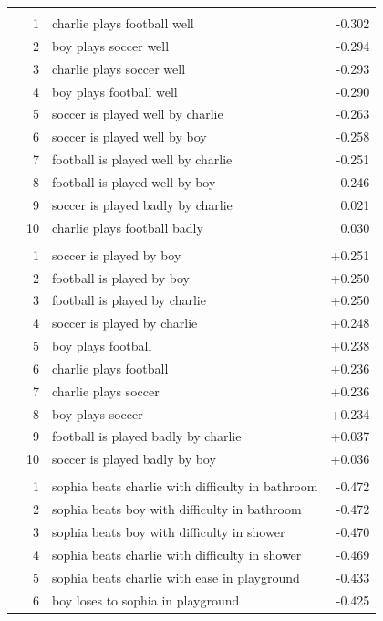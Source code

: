 \begin{longtable}{@{}lrlr@{}}
\bottomrule
\endlastfoot
\multicolumn{4}{l}{\textit{Word -- Hardest}} \\
 & 1 & charlie plays football well & -0.302 \\
 & 2 & boy plays soccer well & -0.294 \\
 & 3 & charlie plays soccer well & -0.293 \\
 & 4 & boy plays football well & -0.290 \\
 & 5 & soccer is played well by charlie & -0.263 \\
 & 6 & soccer is played well by boy & -0.258 \\
 & 7 & football is played well by charlie & -0.251 \\
 & 8 & football is played well by boy & -0.246 \\
 & 9 & soccer is played badly by charlie & 0.021 \\
 & 10 & charlie plays football badly & 0.030 \\
\addlinespace[3pt]
\multicolumn{4}{l}{\textit{Word -- Easiest}} \\
 & 1 & soccer is played by boy & +0.251 \\
 & 2 & football is played by boy & +0.250 \\
 & 3 & football is played by charlie & +0.250 \\
 & 4 & soccer is played by charlie & +0.248 \\
 & 5 & boy plays football & +0.238 \\
 & 6 & charlie plays football & +0.236 \\
 & 7 & charlie plays soccer & +0.236 \\
 & 8 & boy plays soccer & +0.234 \\
 & 9 & football is played badly by charlie & +0.037 \\
 & 10 & soccer is played badly by boy & +0.036 \\
\addlinespace
\multicolumn{4}{l}{\textit{Sentence -- Hardest}} \\
 & 1 & sophia beats charlie with difficulty in bathroom & -0.472 \\
 & 2 & sophia beats boy with difficulty in bathroom & -0.472 \\
 & 3 & sophia beats boy with difficulty in shower & -0.470 \\
 & 4 & sophia beats charlie with difficulty in shower & -0.469 \\
 & 5 & sophia beats charlie with ease in playground & -0.433 \\
 & 6 & boy loses to sophia in playground & -0.425 \\

\end{longtable}
